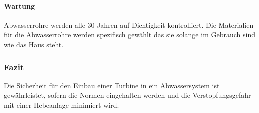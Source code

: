 \paragraph{Wartung}
Abwasserrohre werden alle 30 Jahren auf Dichtigkeit kontrolliert. Die Materialien für die Abwasserrohre werden spezifisch gewählt das sie solange im Gebrauch sind wie das Haus steht. 

\subsubsection{Fazit}

Die Sicherheit für den Einbau einer Turbine in ein Abwassersystem ist gewährleistet, sofern die Normen eingehalten werden und die Verstopfungsgefahr mit einer Hebeanlage minimiert wird. 

\clearpage 





